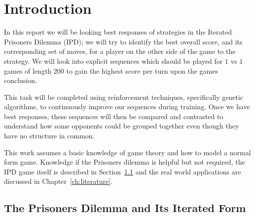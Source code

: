 
\chapter{Introduction}\label{ch:intro}
In this report we will be looking best responses of strategies in the Iterated Prisoners Dilemma (IPD);
we will try to identify the best overall score, and its corresponding set of moves, for a player on the other side of the game to the strategy.
We will look into explicit sequences which should be played for $1$ vs $1$ games of length 200 to gain the highest score per turn upon the games conclusion.

This task will be completed using reinforcement techniques, specifically genetic algorithms, to continuously improve our sequences during training. Once we have best responses, these sequences will then be compared and contrasted to understand how some opponents could be grouped together even though they have no structure in common.

This work assumes a basic knowledge of game theory and how to model a normal form game.
Knowledge if the Prisoners dilemma is helpful but not required, the IPD game itself is described in Section~\ref{sec:iteratedPrisonersDilemma} and the real world applications are discussed in Chapter~\ref{ch:literature}.

\section{The Prisoners Dilemma and Its Iterated Form}\label{sec:iteratedPrisonersDilemma}

